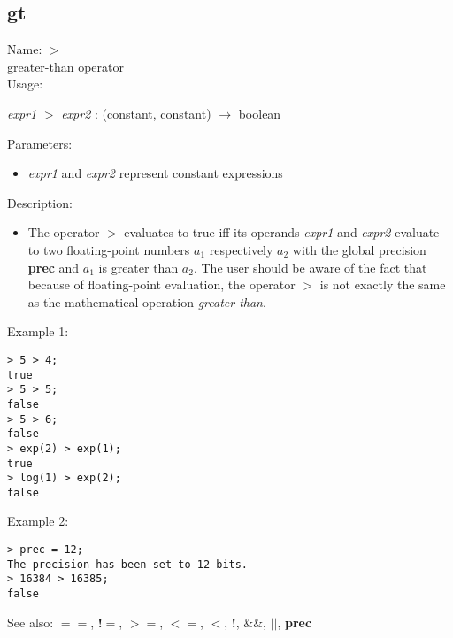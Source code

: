 \subsection{ gt }
\noindent Name: \textbf{$>$}\\
greater-than operator\\

\noindent Usage: 
\begin{center}
\emph{expr1} \textbf{$>$} \emph{expr2} : (\textsf{constant}, \textsf{constant}) $\rightarrow$ \textsf{boolean}\\
\end{center}
Parameters: 
\begin{itemize}
\item \emph{expr1} and \emph{expr2} represent constant expressions
\end{itemize}
\noindent Description: \begin{itemize}

\item The operator \textbf{$>$} evaluates to true iff its operands \emph{expr1} and
   \emph{expr2} evaluate to two floating-point numbers $a_1$
   respectively $a_2$ with the global precision \textbf{prec} and
   $a_1$ is greater than $a_2$. The user should
   be aware of the fact that because of floating-point evaluation, the
   operator \textbf{$>$} is not exactly the same as the mathematical
   operation \emph{greater-than}.
\end{itemize}
\noindent Example 1: 
\begin{center}\begin{minipage}{15cm}\begin{Verbatim}[frame=single]
> 5 > 4;
true
> 5 > 5;
false
> 5 > 6;
false
> exp(2) > exp(1);
true
> log(1) > exp(2);
false
\end{Verbatim}
\end{minipage}\end{center}
\noindent Example 2: 
\begin{center}\begin{minipage}{15cm}\begin{Verbatim}[frame=single]
> prec = 12;
The precision has been set to 12 bits.
> 16384 > 16385;
false
\end{Verbatim}
\end{minipage}\end{center}
See also: \textbf{$==$}, \textbf{!$=$}, \textbf{$>=$}, \textbf{$<=$}, \textbf{$<$}, \textbf{!}, \textbf{$\&\&$}, \textbf{$||$}, \textbf{prec}
